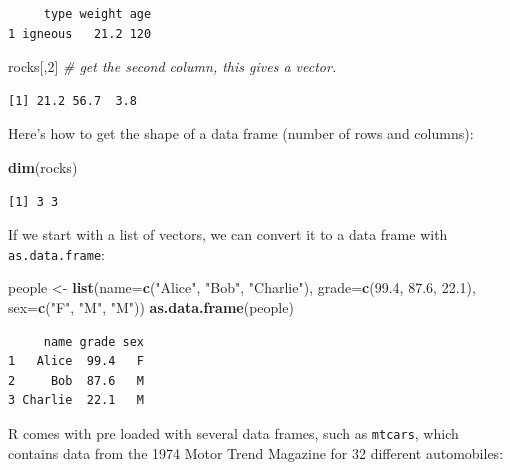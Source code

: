 \documentclass[
]{article}
\newenvironment{Shaded}{\begin{snugshade}}{\end{snugshade}}
\newcommand{\CommentTok}[1]{\textcolor[rgb]{0.56,0.35,0.01}{\textit{#1}}}
\newcommand{\DataTypeTok}[1]{\textcolor[rgb]{0.13,0.29,0.53}{#1}}
\newcommand{\DecValTok}[1]{\textcolor[rgb]{0.00,0.00,0.81}{#1}}
\newcommand{\FloatTok}[1]{\textcolor[rgb]{0.00,0.00,0.81}{#1}}
\newcommand{\KeywordTok}[1]{\textcolor[rgb]{0.13,0.29,0.53}{\textbf{#1}}}
\newcommand{\NormalTok}[1]{#1}
\newcommand{\StringTok}[1]{\textcolor[rgb]{0.31,0.60,0.02}{#1}}
\begin{document}
\begin{verbatim}
     type weight age
1 igneous   21.2 120
\end{verbatim}

\begin{Shaded}
\begin{Highlighting}[]
\NormalTok{rocks[,}\DecValTok{2}\NormalTok{]  }\CommentTok{# get the second column, this gives a vector.}
\end{Highlighting}
\end{Shaded}

\begin{verbatim}
[1] 21.2 56.7  3.8
\end{verbatim}

Here's how to get the shape of a data frame (number of rows and columns):

\begin{Shaded}
\begin{Highlighting}[]
\KeywordTok{dim}\NormalTok{(rocks)  }
\end{Highlighting}
\end{Shaded}

\begin{verbatim}
[1] 3 3
\end{verbatim}

If we start with a list of vectors, we can convert it to a data frame with \texttt{as.data.frame}:

\begin{Shaded}
\begin{Highlighting}[]
\NormalTok{people <-}\StringTok{ }\KeywordTok{list}\NormalTok{(}\DataTypeTok{name=}\KeywordTok{c}\NormalTok{(}\StringTok{"Alice"}\NormalTok{, }\StringTok{"Bob"}\NormalTok{, }\StringTok{"Charlie"}\NormalTok{), }
               \DataTypeTok{grade=}\KeywordTok{c}\NormalTok{(}\FloatTok{99.4}\NormalTok{, }\FloatTok{87.6}\NormalTok{, }\FloatTok{22.1}\NormalTok{), }
               \DataTypeTok{sex=}\KeywordTok{c}\NormalTok{(}\StringTok{"F"}\NormalTok{, }\StringTok{"M"}\NormalTok{, }\StringTok{"M"}\NormalTok{))}
\KeywordTok{as.data.frame}\NormalTok{(people)}
\end{Highlighting}
\end{Shaded}

\begin{verbatim}
     name grade sex
1   Alice  99.4   F
2     Bob  87.6   M
3 Charlie  22.1   M
\end{verbatim}

R comes with pre loaded with several data frames, such as \texttt{mtcars}, which contains data from the 1974 Motor Trend Magazine for 32 different automobiles:
\end{document}
